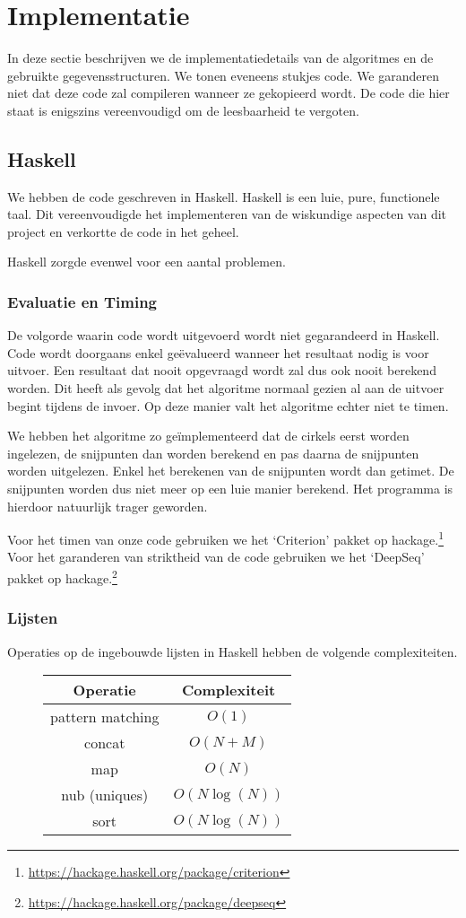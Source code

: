 \newpage
\section{Implementatie}
\label{sec:implementation}
In deze sectie beschrijven we de implementatiedetails van de algoritmes en de gebruikte gegevensstructuren. We tonen eveneens stukjes code. We garanderen niet dat deze code zal compileren wanneer ze gekopieerd wordt. De code die hier staat is enigszins vereenvoudigd om de leesbaarheid te vergoten.

\subsection{Haskell}
We hebben de code geschreven in Haskell. Haskell is een luie, pure,  functionele taal. Dit vereenvoudigde het implementeren van de wiskundige aspecten van dit project en verkortte de code in het geheel.

Haskell zorgde evenwel voor een aantal problemen.

\subsubsection{Evaluatie en Timing}
De volgorde waarin code wordt uitgevoerd wordt niet gegarandeerd in Haskell.
Code wordt doorgaans enkel ge\"evalueerd wanneer het resultaat nodig is voor uitvoer.
Een resultaat dat nooit opgevraagd wordt zal dus ook nooit berekend worden.
Dit heeft als gevolg dat het algoritme normaal gezien al aan de uitvoer begint tijdens de invoer.
Op deze manier valt het algoritme echter niet te timen.

We hebben het algoritme zo ge\"implementeerd dat de cirkels eerst worden ingelezen, de snijpunten dan worden berekend en pas daarna de snijpunten worden uitgelezen. Enkel het berekenen van de snijpunten wordt dan getimet. De snijpunten worden dus niet meer op een luie manier berekend. Het programma is hierdoor natuurlijk trager geworden.

Voor het timen van onze code gebruiken we het `Criterion' pakket op hackage.\footnote{\url{https://hackage.haskell.org/package/criterion}}
Voor het garanderen van striktheid van de code gebruiken we het `DeepSeq' pakket op hackage.\footnote{\url{https://hackage.haskell.org/package/deepseq}}

\subsubsection{Lijsten}
Operaties op de ingebouwde lijsten in Haskell hebben de volgende complexiteiten.
\begin{figure}[H]
\centering
\begin{tabular}{|c|c|}
\hline
Operatie & Complexiteit\\
\hline\hline
pattern matching & $O(1)$\\\hline
concat & $O(N+M)$\\\hline
map & $O(N)$\\\hline
nub (uniques) & $O(N\log(N))$\\\hline
sort & $O(N\log(N))$\\\hline
\end{tabular}
\end{figure}

